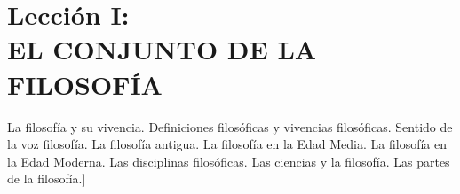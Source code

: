\documentclass[10pt,letterpaper]{book}
\author{Manuel Garc\'{i}a Morente}
\begin{document}
\chapter*{Lecci\'{o}n I:\\EL CONJUNTO DE LA FILOSOF\'{I}A}
La filosofía y su vivencia. Definiciones filosóficas y vivencias filosóficas. Sentido de la voz filosofía. La filosofía antigua.
La filosofía en la Edad Media. La filosofía en la Edad Moderna. Las disciplinas filosóficas. Las ciencias y la filosofía. Las
partes de la filosofía.]
\end{document}
